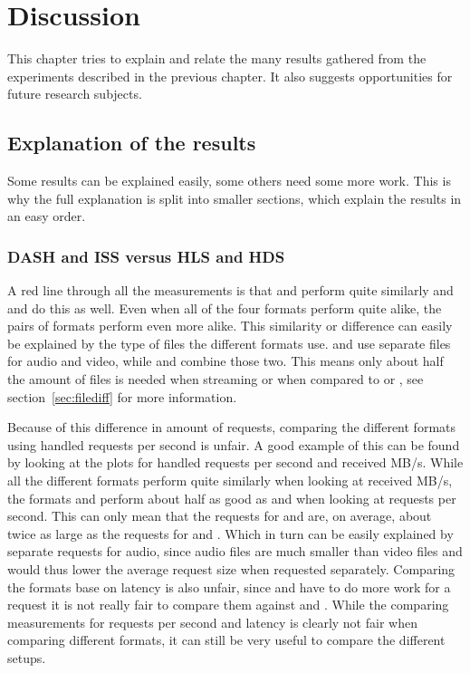 \documentclass[twoside,openright]{uva-bachelor-thesis}
\begin{document}


\chapter{Discussion}
This chapter tries to explain and relate the many results gathered from the
experiments described in the previous chapter. It also suggests opportunities for
future research subjects.

\section{Explanation of the results}
Some results can be explained easily, some others need some more
work. This is why the full explanation is split into smaller sections, which
explain the results in an easy order.


\subsection{DASH and ISS versus HLS and HDS}\label{sec:audiovs}
A red line through all the measurements is that \hls and \hds perform
quite similarly and \dash and \iss do this as well. Even when all of the four
formats perform quite alike, the pairs of formats perform even more alike.
This similarity or difference can easily be explained by the type of files the
different formats use. \dash and \iss use
separate files for audio and video, while \hls and \hds combine those two. This
means only about half the amount of files is needed when streaming \hls or \hds
when compared to \dash or \iss, see section~\ref{sec:filediff} for more
information.

Because of this difference in amount of requests, comparing the different
formats using handled requests per second is unfair. A good example of
this can be found by looking at the plots for handled requests per second and
received MB/s. While all the different formats perform quite similarly when
looking at received MB/s, the formats \hls and \hds perform about half as good as
\dash and \iss when looking at requests per second. This can only mean that the
requests for \hds and \hls are, on average, about twice as large as the requests
for \dash and \iss. Which in turn can be easily explained by separate requests
for audio, since audio files are much smaller than video files and would thus
lower the average request size when requested separately. Comparing the formats
base on latency is also unfair, since \hls and \hds have to do more work for a
request it is not really fair to compare them against \dash and \iss. While the
comparing measurements for requests per second and latency is clearly not fair
when comparing different formats, it can still be very useful to compare the
different setups.
\end{document}
